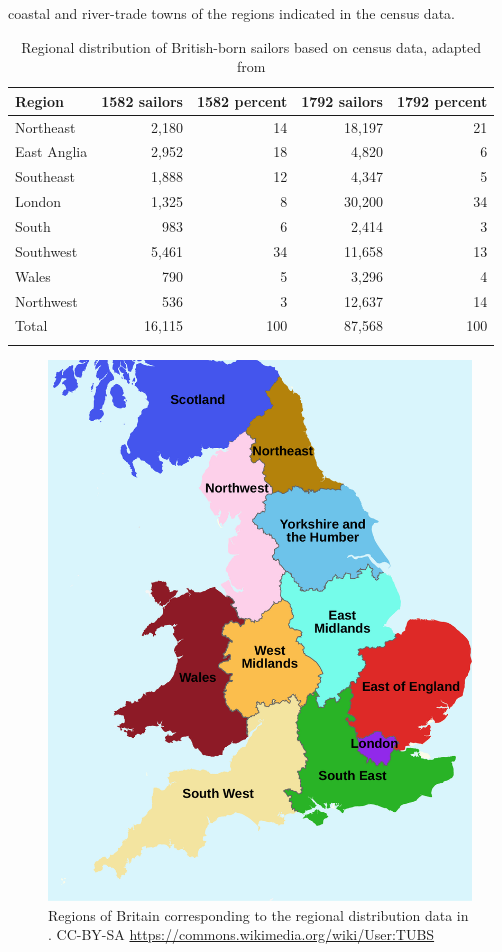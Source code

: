 coastal and river-trade towns of the regions indicated in the census data. 

\begin{table}
 \caption{Regional distribution of British-born sailors based on census data, adapted from \citet[76]{Earle1998}}
\label{tab:key:3.3}
\begin{tabular}{lrrrr}
\lsptoprule
Region & 1582 sailors & 1582 percent & 1792 sailors & 1792 percent \\
\midrule
Northeast  & 2,180 & 14 & 18,197 & 21\\
East Anglia & 2,952 & 18 & 4,820 & 6 \\
Southeast  & 1,888 & 12 & 4,347 & 5 \\
London  & 1,325 & 8 & 30,200 & 34 \\
South & 983 & 6 & 2,414 & 3 \\
Southwest & 5,461 & 34 & 11,658 & 13 \\
Wales & 790 & 5 & 3,296 & 4 \\
Northwest & 536 & 3 & 12,637 & 14 \\
\midrule 
Total & 16,115 & 100 & 87,568 & 100 \\
\lspbottomrule 
\end{tabular}
 \end{table}


\begin{figure}
\caption{Regions of Britain corresponding to the regional distribution data in .
{\tiny CC-BY-SA \url{https://commons.wikimedia.org/wiki/User:TUBS}}
}
\label{fig:key:3.2}
\includegraphics[height=.45\textheight]{figures/fig23.pdf}
\end{figure}

